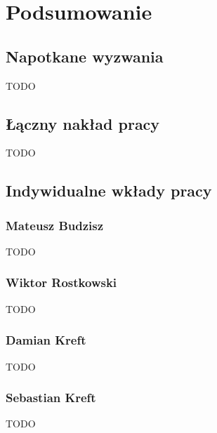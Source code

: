 
\chapter{Podsumowanie}
\label{ch:podsumowanie}

\section{Napotkane wyzwania}
\label{sec:napotkane-wyzwania}

TODO

\section{Łączny nakład pracy}
\label{sec:laczny-naklad-pracy}

TODO

\section{Indywidualne wkłady pracy}
\label{sec:indywidualne-wklady-pracy}

\subsection{Mateusz Budzisz}
\label{subsec:mateusz-budzisz}

TODO

\subsection{Wiktor Rostkowski}
\label{subsec:wiktor-rostkowski}

TODO

\subsection{Damian Kreft}
\label{subsec:damian-kreft}

TODO

\subsection{Sebastian Kreft}
\label{subsec:sebastian-kreft}

TODO
